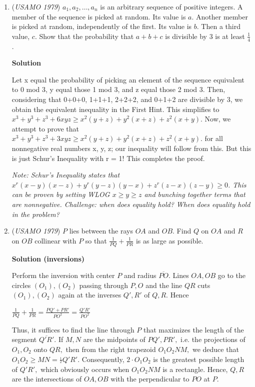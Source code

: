 \begin{enumerate}
	\item (\textit{USAMO 1979}) $a_1, a_2, \ldots, a_n$ is an arbitrary sequence of positive integers. A member of the sequence is picked at 
random. Its value is $a$. Another member is picked at random, independently of the first. Its value is $b$. Then a third value, $c$. Show that the probability that $a + b + c$ is divisible by $3$ is at least $\frac14$.


 



\textbf{Solution}

Let x equal the probability of picking an element of the sequence equivalent to 0 mod 3, y equal those 1 mod 3, and z equal those 2 mod 3. Then, considering that 0+0+0, 1+1+1, 2+2+2, and 0+1+2 are divisible by 3, we obtain the equivalent inequality in the First Hint. This simplifies to $x^3 + y^3 + z^3 + 6xyz \ge x^2(y+z) + y^2(x+z) + z^2(x+y).$ Now, we attempt to prove that $x^3 + y^3 + z^3 + 3xyz \ge x^2(y+z) + y^2(x+z) + z^2(x+y).$ for all nonnegative real numbers x, y, z; our inequality will follow from this. But this is just Schur's Inequality with r = 1! This completes the proof.

 \textit{Note: Schur's Inequality states that $x^r(x-y)(x-z) + y^r(y-z)(y-x) + z^r(z-x)(z-y) \ge 0$. This can be proven by setting WLOG $x \ge y \ge z$ and bunching together terms that are nonnegative. Challenge: when does equality hold? When does equality hold in the problem?}

 


	\item (\textit{USAMO 1979}) $P$ lies between the rays $OA$ and $OB$. Find $Q$ on $OA$ and $R$ on $OB$ collinear with $P$ so that $\frac{1}{PQ} + \frac{1}{PR}$ is as large as possible.


 



\textbf{Solution (inversions)}

Perform the inversion with center $P$ and radius $\overline{PO}.$ Lines $OA,OB$ go to the circles $(O_1),(O_2)$ passing through $P,O$ and the line $QR$ cuts $(O_1),(O_2)$ again at the inverses $Q',R'$ of $Q,R.$ Hence

 $\frac{1}{PQ}+\frac{1}{PR}=\frac{PQ'+PR'}{PO^2}=\frac{Q'R'}{PO^2}$

 Thus, it suffices to find the line through $P$ that maximizes the length of the  segment $\overline{Q'R'}.$ If $M,N$ are the midpoints of $PQ',PR',$ i.e. the projections of $O_1,O_2$ onto $QR,$ then from the right trapezoid $O_1O_2NM,$ we deduce that $O_1O_2 \ge MN = \frac{_1}{^2}Q'R'.$ Consequently, $2 \cdot O_1O_2$ is the greatest possible length of $Q'R',$ which obviously occurs when $O_1O_2NM$ is a rectangle. Hence, $Q,R$ are the intersections of $OA,OB$ with the perpendicular to $PO$ at $P.$





\end{enumerate}
